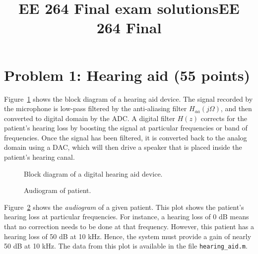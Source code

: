 \documentclass[10pt]{article}
\title{EE 264 Final exam solutions}
\title{EE 264 Final}
\begin{document}

\pagebreak

\section*{Problem 1: Hearing aid (55 points)}

Figure~\ref{fig:hearing_aid_diagram} shows the block diagram of a hearing aid device. The signal recorded by the microphone is low-pass filtered by the anti-aliasing filter $H_{aa}(j\Omega)$, and then converted to digital domain by the ADC. A digital filter $H(z)$ corrects for the patient's hearing loss by boosting the signal at particular frequencies or band of frequencies. Once the signal has been filtered, it is converted back to the analog domain using a DAC, which will then drive a speaker that is placed inside the patient's hearing canal. 

\FloatBarrier
\begin{figure}[h!]
	\centering
	\resizebox{\textwidth}{!}{}
	\caption{Block diagram of a digital hearing aid device.}
	\label{fig:hearing_aid_diagram}
\end{figure}
\FloatBarrier

\FloatBarrier
\begin{figure}[h!]
	\centering
	\resizebox{0.7\textwidth}{!}{}
	\caption{Audiogram of patient.}
	\label{fig:audiogram}
\end{figure}
\FloatBarrier

Figure~\ref{fig:audiogram} shows the \textit{audiogram} of a given patient. This plot shows the patient's hearing loss at particular frequencies. For instance, a hearing loss of 0 dB means that no correction needs to be done at that frequency. However, this patient has a hearing loss of 50 dB at 10 kHz. Hence, the system must provide a gain of nearly 50 dB at 10 kHz. The data from this plot is available in the file \texttt{hearing\_aid.m}. 
\end{document}
